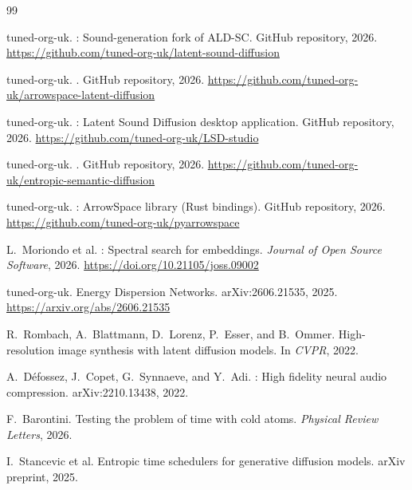 \documentclass[12pt,a4paper]{article}
\begin{document}
\newpage

\begin{thebibliography}{99}

tuned-org-uk.
: Sound-generation fork of ALD-SC.
\newblock GitHub repository, 2026.
\newblock \url{https://github.com/tuned-org-uk/latent-sound-diffusion}

tuned-org-uk.
.
\newblock GitHub repository, 2026.
\newblock \url{https://github.com/tuned-org-uk/arrowspace-latent-diffusion}

tuned-org-uk.
: Latent Sound Diffusion desktop application.
\newblock GitHub repository, 2026.
\newblock \url{https://github.com/tuned-org-uk/LSD-studio}

tuned-org-uk.
.
\newblock GitHub repository, 2026.
\newblock \url{https://github.com/tuned-org-uk/entropic-semantic-diffusion}

tuned-org-uk.
: ArrowSpace library (Rust bindings).
\newblock GitHub repository, 2026.
\newblock \url{https://github.com/tuned-org-uk/pyarrowspace}

L.\ Moriondo et al.
: Spectral search for embeddings.
\newblock \textit{Journal of Open Source Software}, 2026.
\newblock \url{https://doi.org/10.21105/joss.09002}

tuned-org-uk.
\newblock Energy Dispersion Networks.
\newblock arXiv:2606.21535, 2025.
\newblock \url{https://arxiv.org/abs/2606.21535}

R.\ Rombach, A.\ Blattmann, D.\ Lorenz, P.\ Esser, and B.\ Ommer.
\newblock High-resolution image synthesis with latent diffusion models.
\newblock In \textit{CVPR}, 2022.

A.\ D\'{e}fossez, J.\ Copet, G.\ Synnaeve, and Y.\ Adi.
: High fidelity neural audio compression.
\newblock arXiv:2210.13438, 2022.

F.\ Barontini.
\newblock Testing the problem of time with cold atoms.
\newblock \textit{Physical Review Letters}, 2026.

I.\ Stancevic et al.
\newblock Entropic time schedulers for generative diffusion models.
\newblock arXiv preprint, 2025.


\end{thebibliography}
\end{document}
